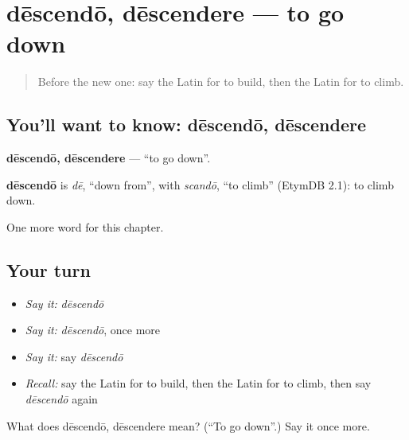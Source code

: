 \section[dēscendō, dēscendere]{dēscendō, dēscendere — to go down}

\label{lesson:LA-C153-descendo}



\begin{quote}
Before the new one: say the Latin for to build, then the Latin for to climb.
\end{quote}

\subsection*{You'll want to know: dēscendō, dēscendere}
\textbf{dēscendō, dēscendere} — \textquotedblleft{}to go down\textquotedblright{}.

\begin{cousinweb}
\textbf{dēscendō} is \emph{dē}, \textquotedblleft{}down from\textquotedblright{}, with \emph{scandō}, \textquotedblleft{}to climb\textquotedblright{} (EtymDB 2.1): to climb down.
\end{cousinweb}

\begin{grammarlens}[title={What you've built}]
One more word for this chapter.
\end{grammarlens}

\subsection*{Your turn}
\begin{itemize}
\raggedright
  \item \emph{Say it:} \emph{dēscendō}
  \item \emph{Say it:} \emph{dēscendō}, once more
  \item \emph{Say it:} say \emph{dēscendō}
  \item \emph{Recall:} say the Latin for to build, then the Latin for to climb, then say \emph{dēscendō} again
\end{itemize}

\begin{tcolorbox}[breakable,colback=teal!4,colframe=teal!35!black,title={Before you move on}]
What does dēscendō, dēscendere mean? (\textquotedblleft{}To go down\textquotedblright{}.) Say it once more.
\end{tcolorbox}
